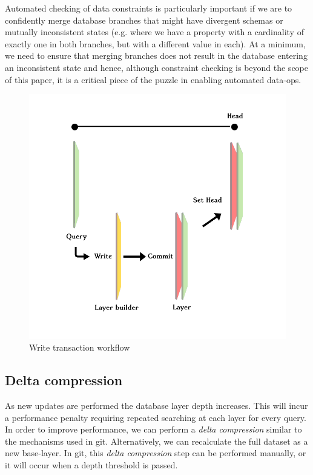 \documentclass[10pt, a4paper, twocolumn]{article} %
\begin{document}
Automated checking of data constraints is particularly important if we
are to confidently merge database branches that might have divergent
schemas or mutually inconsistent states (e.g. where we have a property
with a cardinality of exactly one in both branches, but with a
different value in each). At a minimum, we need to ensure that merging
branches does not result in the database entering an inconsistent
state and hence, although constraint checking is beyond the scope of
this paper, it is a critical piece of the puzzle in enabling automated
data-ops\cite{gleason2018}.

\begin{figure}
	\includegraphics[width=\linewidth]{query_write_commit_head} %
	\caption{Write transaction workflow} %
	\label{workflow} %
\end{figure}


\subsection{Delta compression}

As new updates are performed the database layer depth increases. This
will incur a performance penalty requiring repeated searching at each
layer for every query. In order to improve performance, we can perform
a {\em delta compression} similar to the mechanisms used in
git. Alternatively, we can recalculate the full dataset as a new
base-layer. In git, this {\em delta compression} step can be performed
manually, or it will occur when a depth threshold is passed.
\end{document}
